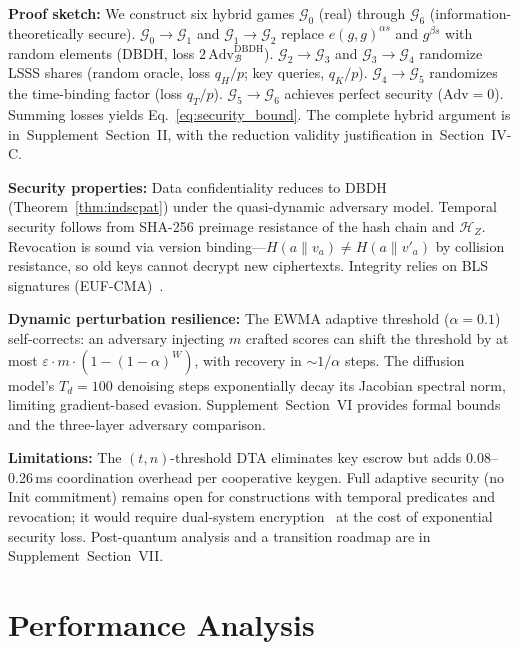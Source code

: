 \documentclass[lettersize,journal]{IEEEtran}
\begin{document}
\textbf{Proof sketch:} We construct six hybrid games $\mathcal{G}_0$ (real) through $\mathcal{G}_6$ (information-theoretically secure). $\mathcal{G}_0\rightarrow\mathcal{G}_1$ and $\mathcal{G}_1\rightarrow\mathcal{G}_2$ replace $e(g,g)^{\alpha s}$ and $g^{\beta s}$ with random elements (DBDH, loss $2\,\text{Adv}_{\mathcal{B}}^{\text{DBDH}}$). $\mathcal{G}_2\rightarrow\mathcal{G}_3$ and $\mathcal{G}_3\rightarrow\mathcal{G}_4$ randomize LSSS shares (random oracle, loss $q_H/p$; key queries, $q_K/p$). $\mathcal{G}_4\rightarrow\mathcal{G}_5$ randomizes the time-binding factor (loss $q_T/p$). $\mathcal{G}_5\rightarrow\mathcal{G}_6$ achieves perfect security ($\text{Adv}=0$). Summing losses yields Eq.~\eqref{eq:security_bound}. The complete hybrid argument is in~Supplement~Section~II, with the reduction validity justification in~Section~IV-C.

\textbf{Security properties:} Data confidentiality reduces to DBDH (Theorem~\ref{thm:indscpat}) under the quasi-dynamic adversary model. Temporal security follows from SHA-256 preimage resistance of the hash chain and $\mathcal{H}_Z$. Revocation is sound via version binding---$H(a\|v_a) \neq H(a\|v'_a)$ by collision resistance, so old keys cannot decrypt new ciphertexts. Integrity relies on BLS signatures (EUF-CMA)~\cite{Boneh1998_DDH, Boneh2004_BLS}.

\textbf{Dynamic perturbation resilience:} The EWMA adaptive threshold ($\alpha=0.1$) self-corrects: an adversary injecting $m$ crafted scores can shift the threshold by at most $\varepsilon\!\cdot\!m\!\cdot\!(1{-}(1{-}\alpha)^W)$, with recovery in $\sim\!1/\alpha$ steps. The diffusion model's $T_d{=}100$ denoising steps exponentially decay its Jacobian spectral norm, limiting gradient-based evasion. Supplement~Section~VI provides formal bounds and the three-layer adversary comparison.

\textbf{Limitations:} The $(t,n)$-threshold DTA eliminates key escrow but adds 0.08--0.26\,ms coordination overhead per cooperative keygen. Full adaptive security (no Init commitment) remains open for constructions with temporal predicates and revocation; it would require dual-system encryption~\cite{Waters2011} at the cost of exponential security loss. Post-quantum analysis and a transition roadmap are in Supplement~Section~VII.

\section{Performance Analysis}
\label{sec:performance}
\end{document}
